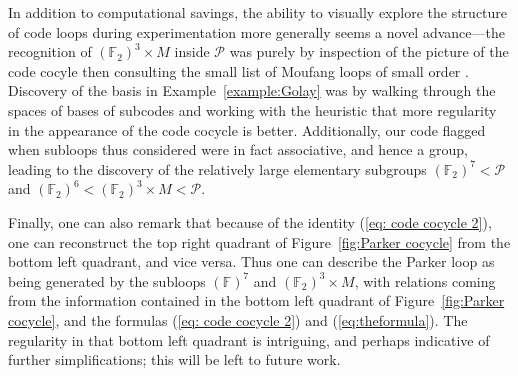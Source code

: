 \documentclass{article}
\theoremstyle{plain}
\theoremstyle{definition}
\def \cP {\mathcal{P}}
\def \FF {\mathbb{F}}
\begin{document}
In addition to computational savings, the ability to visually explore the structure of code loops during experimentation more generally seems a novel advance---the recognition of $(\FF_2)^3\times M$ inside $\cP$ was purely by inspection of the picture of the code cocyle then consulting the small list of Moufang loops of small order \cite{Chein}.
Discovery of the basis in Example~\ref{example:Golay} was by walking through the spaces of bases of subcodes and working with the heuristic that more regularity in the appearance of the code cocycle is better.
Additionally, our code flagged when subloops thus considered were in fact associative, and hence a group, leading to the discovery of the relatively large elementary subgroups $(\FF_2)^7 < \cP$ and $(\FF_2)^6 < (\FF_2)^3\times M < \cP$. 

Finally, one can also remark that because of the identity (\ref{eq: code cocycle 2}), one can reconstruct the top right quadrant of Figure~\ref{fig:Parker cocycle} from the bottom left quadrant, and vice versa. 
Thus one can describe the Parker loop as being generated by the subloops $(\FF)^7$ and $(\FF_2)^3\times M$, with relations coming from the information contained in the bottom left quadrant of Figure~\ref{fig:Parker cocycle}, and the formulas (\ref{eq: code cocycle 2}) and (\ref{eq:theformula}).
The regularity in that bottom left quadrant is intriguing, and perhaps indicative of further simplifications; this will be left to future work.









\end{document}
